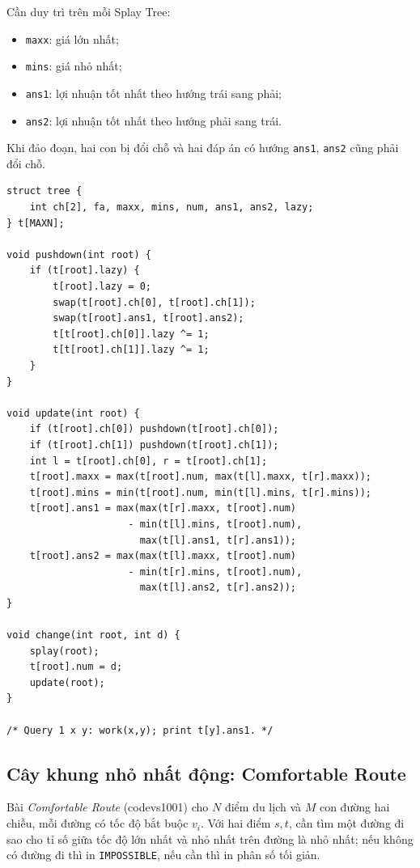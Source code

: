 \documentclass[11pt]{article}
\begin{document}
Cần duy trì trên mỗi Splay Tree:
\begin{itemize}
  \item \texttt{maxx}: giá lớn nhất;
  \item \texttt{mins}: giá nhỏ nhất;
  \item \texttt{ans1}: lợi nhuận tốt nhất theo hướng trái sang phải;
  \item \texttt{ans2}: lợi nhuận tốt nhất theo hướng phải sang trái.
\end{itemize}

Khi đảo đoạn, hai con bị đổi chỗ và hai đáp án có hướng \texttt{ans1},
\texttt{ans2} cũng phải đổi chỗ.

\begingroup
\small
\begin{verbatim}
struct tree {
    int ch[2], fa, maxx, mins, num, ans1, ans2, lazy;
} t[MAXN];

void pushdown(int root) {
    if (t[root].lazy) {
        t[root].lazy = 0;
        swap(t[root].ch[0], t[root].ch[1]);
        swap(t[root].ans1, t[root].ans2);
        t[t[root].ch[0]].lazy ^= 1;
        t[t[root].ch[1]].lazy ^= 1;
    }
}

void update(int root) {
    if (t[root].ch[0]) pushdown(t[root].ch[0]);
    if (t[root].ch[1]) pushdown(t[root].ch[1]);
    int l = t[root].ch[0], r = t[root].ch[1];
    t[root].maxx = max(t[root].num, max(t[l].maxx, t[r].maxx));
    t[root].mins = min(t[root].num, min(t[l].mins, t[r].mins));
    t[root].ans1 = max(max(t[r].maxx, t[root].num)
                     - min(t[l].mins, t[root].num),
                       max(t[l].ans1, t[r].ans1));
    t[root].ans2 = max(max(t[l].maxx, t[root].num)
                     - min(t[r].mins, t[root].num),
                       max(t[l].ans2, t[r].ans2));
}

void change(int root, int d) {
    splay(root);
    t[root].num = d;
    update(root);
}

/* Query 1 x y: work(x,y); print t[y].ans1. */
\end{verbatim}
\endgroup

\subsection{Cây khung nhỏ nhất động: Comfortable Route}

Bài \textit{Comfortable Route} (codevs1001) cho $N$ điểm du lịch và $M$ con
đường hai chiều, mỗi đường có tốc độ bắt buộc $v_i$.  Với hai điểm $s,t$, cần
tìm một đường đi sao cho tỉ số giữa tốc độ lớn nhất và nhỏ nhất trên đường là
nhỏ nhất; nếu không có đường đi thì in \texttt{IMPOSSIBLE}, nếu cần thì in
phân số tối giản.
\end{document}
